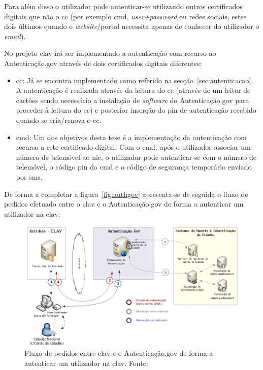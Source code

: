 Para além disso o utilizador pode autenticar-se utilizando outros certificados digitais que não o \acrshort{cc} (por exemplo \acrfull{cmd}, \textit{user+password} ou redes sociais, estes dois últimos quando o \textit{website}/portal necessita apenas de conhecer do utilizador o \textit{email}).

No projeto \acrshort{clav} irá ser implementado a autenticação com recurso ao Autenticação.gov através de dois certificados digitais diferentes:
\begin{itemize}
    \item \acrfull{cc}: Já se encontra implementado como referido na secção~\ref{sec:autenticacao}. A autenticação é realizada através da leitura do \acrshort{cc} (através de um leitor de cartões sendo necessário a instalação de \textit{software} do Autenticação.gov para proceder à leitura do \acrshort{cc}) e posterior inserção do \acrshort{pin} de autenticação recebido quando se cria/renova o \acrshort{cc}.
    \item \acrfull{cmd}: Um dos objetivos desta tese é a implementação da autenticação com recurso a este certificado digital. Com o \acrshort{cmd}, após o utilizador associar um número de telemóvel ao \acrshort{nic}, o utilizador pode autenticar-se com o número de telemóvel, o código \acrshort{pin} da \acrshort{cmd} e o código de segurança temporário enviado por \acrshort{sms}.
\end{itemize}

De forma a completar a figura~\ref{fig:authgov} apresenta-se de seguida o fluxo de pedidos efetuado entre o \acrshort{clav} e o Autenticação.gov de forma a autenticar um utilizador na \acrshort{clav}:~\cite{agov}
\begin{figure}[H]
    \begin{center}
        \includegraphics[width=1\textwidth]{img/fluxoauthgov.png}
    \end{center}
    \caption{Fluxo de pedidos entre \acrshort{clav} e o Autenticação.gov de forma a autenticar um utilizador na \acrshort{clav}. Fonte:~\cite{agov}}\label{fig:fluxoauthgov}
\end{figure}

